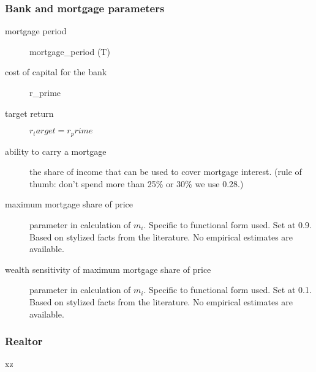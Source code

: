    \subsubsection{Bank and mortgage parameters}
\begin{description}
\item[mortgage period]  mortgage_period (T)
\item[cost of capital for the bank] r_prime
\item[target return] $r_target = r_prime$ %

\item [{ability to carry a mortgage}] the share of income that can be used to cover mortgage interest. (rule of thumb: don't spend more than 25\% or 30\% we use 0.28.)
\item [maximum mortgage share of price] parameter in calculation of $m_i$. Specific to functional form used. Set at 0.9. Based on stylized facts from the literature.  No empirical estimates are available. 

\item [wealth sensitivity of maximum mortgage share of price] parameter in calculation of $m_i$. Specific to functional form used. Set at 0.1. Based on stylized facts from the literature.  No empirical estimates are available. 

\end{description}

    \subsubsection{Realtor}
\begin{description}
\item[xz] 
\end{description}


